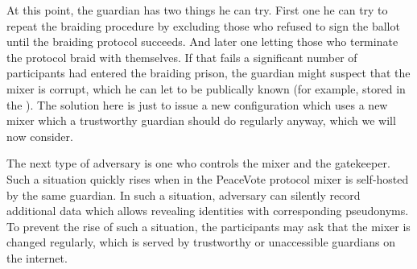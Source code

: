 \documentclass[12pt,a4paper]{article}
\renewcommand{\texttt}[1]{\jlinl{#1}}
\begin{document}
At this point, the guardian has two things he can try. First one he can try to repeat the braiding procedure by excluding those who refused to sign the ballot until the braiding protocol succeeds. And later one letting those who terminate the protocol braid with themselves. If that fails a significant number of participants had entered the braiding prison, the guardian might suspect that the mixer is corrupt, which he can let to be publically known (for example, stored in the \texttt{BraidChain}). The solution here is just to issue a new configuration which uses a new mixer which a trustworthy guardian should do regularly anyway, which we will now consider.\par
The next type of adversary is one who controls the mixer and the gatekeeper. Such a situation quickly rises when in the PeaceVote protocol mixer is self-hosted by the same guardian. In such a situation, adversary can silently record additional data which allows revealing identities with corresponding pseudonyms. To prevent the rise of such a situation, the participants may ask that the mixer is changed regularly, which is served by trustworthy or unaccessible guardians on the internet.\par
\end{document}
